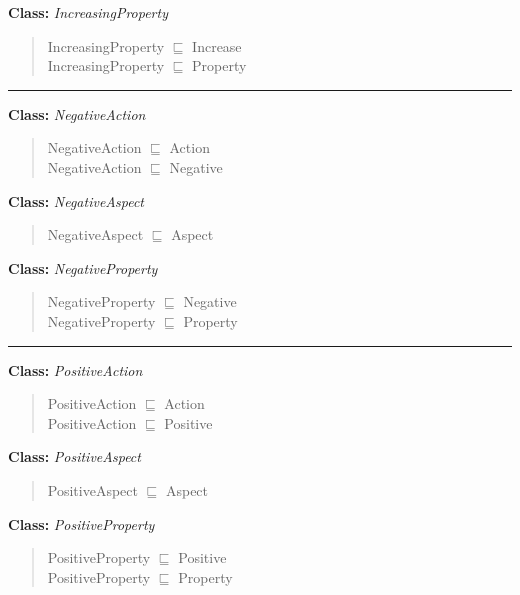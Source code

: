 \documentclass[
]{article}
\begin{document}
\textbf{Class:} \emph{IncreasingProperty}

\begin{quote}
IncreasingProperty \(\sqsubseteq\) Increase\\
IncreasingProperty \(\sqsubseteq\) Property
\end{quote}

\begin{center}\rule{0.5\linewidth}{0.5pt}\end{center}

\textbf{Class:} \emph{NegativeAction}

\begin{quote}
NegativeAction \(\sqsubseteq\) Action\\
NegativeAction \(\sqsubseteq\) Negative
\end{quote}

\textbf{Class:} \emph{NegativeAspect}

\begin{quote}
NegativeAspect \(\sqsubseteq\) Aspect
\end{quote}

\textbf{Class:} \emph{NegativeProperty}

\begin{quote}
NegativeProperty \(\sqsubseteq\) Negative\\
NegativeProperty \(\sqsubseteq\) Property
\end{quote}

\begin{center}\rule{0.5\linewidth}{0.5pt}\end{center}

\textbf{Class:} \emph{PositiveAction}

\begin{quote}
PositiveAction \(\sqsubseteq\) Action\\
PositiveAction \(\sqsubseteq\) Positive
\end{quote}

\textbf{Class:} \emph{PositiveAspect}

\begin{quote}
PositiveAspect \(\sqsubseteq\) Aspect
\end{quote}

\textbf{Class:} \emph{PositiveProperty}

\begin{quote}
PositiveProperty \(\sqsubseteq\) Positive\\
PositiveProperty \(\sqsubseteq\) Property
\end{quote}
\end{document}
